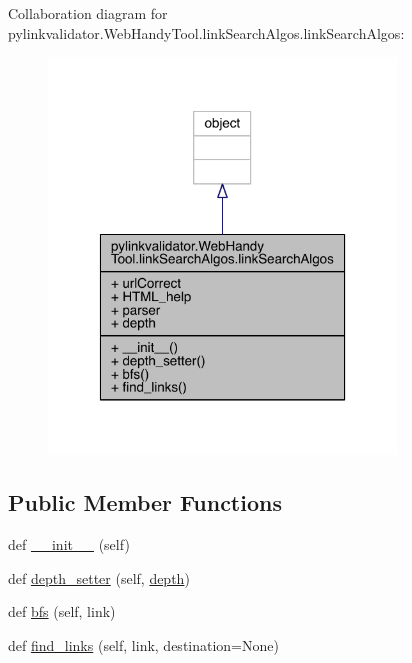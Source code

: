 Collaboration diagram for pylinkvalidator.\+Web\+Handy\+Tool.\+link\+Search\+Algos.\+link\+Search\+Algos\+:
\nopagebreak
\begin{figure}[H]
\begin{center}
\leavevmode
\includegraphics[width=262pt]{classpylinkvalidator_1_1_web_handy_tool_1_1link_search_algos_1_1link_search_algos__coll__graph}
\end{center}
\end{figure}
\subsection*{Public Member Functions}
\begin{DoxyCompactItemize}
\item 
def \hyperlink{classpylinkvalidator_1_1_web_handy_tool_1_1link_search_algos_1_1link_search_algos_a9aa0ef968fed3bf2cb5588a84658fa6c}{\+\_\+\+\_\+init\+\_\+\+\_\+} (self)
\item 
def \hyperlink{classpylinkvalidator_1_1_web_handy_tool_1_1link_search_algos_1_1link_search_algos_ad4cf802e4c3d47fc31b9d1e8e4c7c3d5}{depth\+\_\+setter} (self, \hyperlink{classpylinkvalidator_1_1_web_handy_tool_1_1link_search_algos_1_1link_search_algos_ab4bb72e4cdf3e63f85c88e49fe2abec6}{depth})
\item 
def \hyperlink{classpylinkvalidator_1_1_web_handy_tool_1_1link_search_algos_1_1link_search_algos_a3c4cb4d12b1850f7da9b84e612eac9bd}{bfs} (self, link)
\item 
def \hyperlink{classpylinkvalidator_1_1_web_handy_tool_1_1link_search_algos_1_1link_search_algos_aa4e7f6b9aa325f9cc21fe7aefd9ecad1}{find\+\_\+links} (self, link, destination=None)
\end{DoxyCompactItemize}
